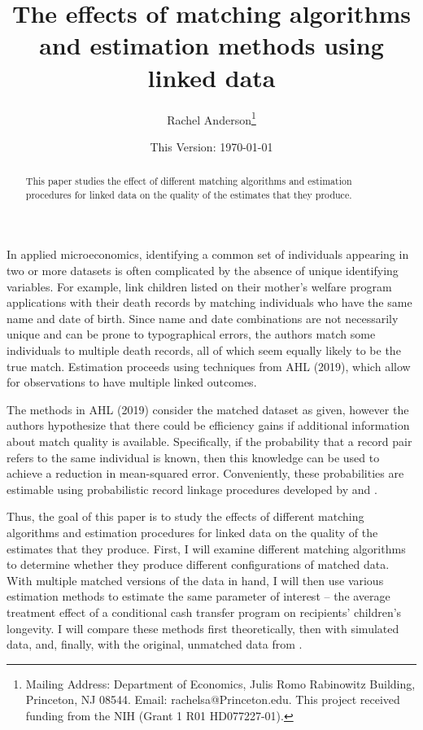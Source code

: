 \documentclass[12pt]{article}
\title{\singlespacing The effects of matching algorithms and estimation methods using linked data}
\author{Rachel Anderson\thanks{Mailing Address: Department of Economics, Julis Romo Rabinowitz Building,
Princeton, NJ 08544. Email: rachelsa@Princeton.edu.
This project received funding from the NIH (Grant 1 R01 HD077227-01). }}
\date{This Version: \today}
\begin{document}
\maketitle


\begin{abstract}
\singlespacing
\noindent This paper studies the effect of different matching algorithms and estimation procedures for linked data on the quality of the estimates that they produce.  
\end{abstract}

\begin{Introduction}
In applied microeconomics, identifying a common set of individuals appearing in two or more datasets is often complicated by the absence of unique identifying variables. For example,  \cite{CITE HERE} link children listed on their mother's welfare program applications with their death records by matching individuals who have the same name and date of birth.  Since name and date combinations are not necessarily unique and can be prone to typographical errors, the authors match some individuals to multiple death records, all of which seem equally likely to be the true match.  Estimation proceeds using techniques from AHL (2019), which allow for observations to have multiple linked outcomes.  

The methods in AHL (2019) consider the matched dataset as given, however the authors hypothesize that there could be efficiency gains if additional information about match quality is available.  Specifically, if the probability that a record pair refers to the same individual is known, then this knowledge can be used to achieve a reduction in mean-squared error.  Conveniently, these probabilities are estimable using probabilistic record linkage procedures developed by \cite{FellegiSunter} and \cite{Name}. 

Thus, the goal of this paper is to study the effects of different matching algorithms and estimation procedures for linked data on the quality of the estimates that they produce.  First, I will examine different matching algorithms to determine whether they produce different configurations of matched data.  With multiple matched versions of the data in hand, I will then use various estimation methods to estimate the same parameter of interest -- the average treatment effect of a conditional cash transfer program on recipients' children's longevity.   I will compare these methods first theoretically, then with simulated data, and, finally, with the original, unmatched data from \cite{}.   


\end{Introduction}
\end{document}
